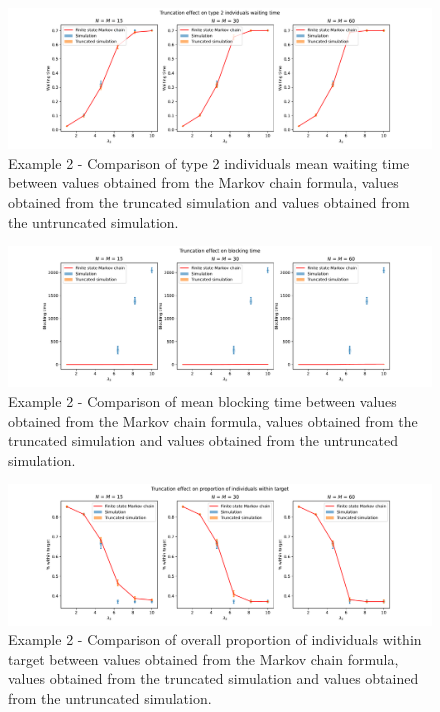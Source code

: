 \begin{figure}[H]
    \includegraphics[width=\textwidth]{chapters/03_queueing_model/Bin/numeric_results_and_timings/truncation_effect_2/waiting_time_type_2.pdf}
    \caption{
        Example 2 - Comparison of type 2 individuals mean waiting time
        between values
        obtained from the Markov chain formula, values obtained from the
        truncated simulation and values obtained from the untruncated
        simulation.
    }
    \label{fig:markov_vs_des_waiting_time_comparison_type_2_2}
\end{figure}

\begin{figure}[H]
    \includegraphics[width=\textwidth]{chapters/03_queueing_model/Bin/numeric_results_and_timings/truncation_effect_2/blocking_time_type_2.pdf}
    \caption{
        Example 2 - Comparison of mean blocking time between values obtained
        from the Markov
        chain formula, values obtained from the truncated simulation and values
        obtained from the untruncated simulation.
    }
    \label{fig:markov_vs_des_blocking_time_comparison_overall_2}
\end{figure}


\begin{figure}[H]
    \includegraphics[width=\textwidth]{chapters/03_queueing_model/Bin/numeric_results_and_timings/truncation_effect_2/proportion_overall.pdf}
    \caption{
        Example 2 - Comparison of overall proportion of individuals within
        target between values obtained from the
        Markov chain formula, values obtained from the truncated simulation and
        values obtained from the untruncated simulation.
    }
    \label{fig:markov_vs_des_proportion_within_time_comparison_overall_2}
\end{figure}

